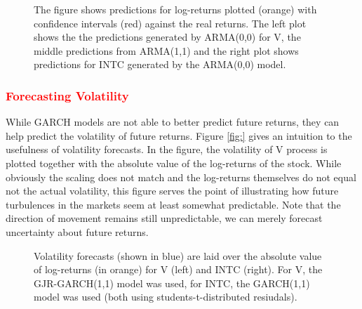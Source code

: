 \begin{figure}[h]
    \centering
    \begin{adjustbox}{width = 0.95\textwidth}
    
    
    
    \end{adjustbox}
    \caption{The figure shows predictions for log-returns plotted (orange) with confidence intervals (red) against the real returns. The left plot shows the the predictions generated by ARMA(0,0) for V, the middle predictions from ARMA(1,1) and the right plot shows predictions for INTC generated by the ARMA(0,0) model.}
    \label{fig:V_INTC_ARMA_predictions_plot}
\end{figure}{}

\subsubsection{\textcolor{red}{Forecasting Volatility}}
While GARCH models are not able to better predict future returns, they can help predict the volatility of future returns. Figure \ref{fig:} gives an intuition to the usefulness of volatility forecasts. In the figure, the volatility of V process is plotted together with the absolute value of the log-returns of the stock. While obviously the scaling does not match and the log-returns themselves do not equal not the actual volatility, this figure serves the point of illustrating how future turbulences in the markets seem at least somewhat predictable. Note that the direction of movement remains still unpredictable, we can merely forecast uncertainty about future returns. 

\begin{figure}[h]
    \centering
    \begin{adjustbox}{width = 0.95\textwidth}
    
    
    \end{adjustbox}
    \caption{Volatility forecasts (shown in blue) are laid over the absolute value of log-returns (in orange) for V (left) and INTC (right). For V, the GJR-GARCH(1,1) model was used, for INTC, the GARCH(1,1) model was used (both using students-t-distributed resiudals).}
    \label{fig:V_INTC_ARMA_predictions_plot}
\end{figure}{}



